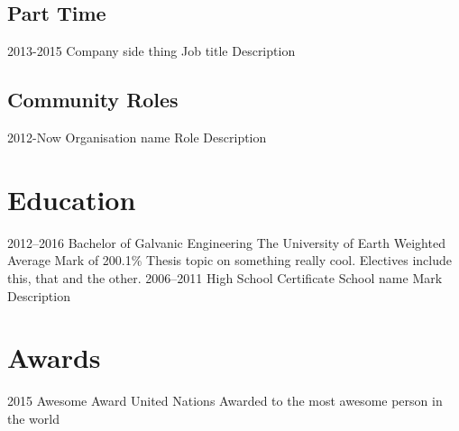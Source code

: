 \documentclass[print]{friggeri-cv}
\begin{document}
    \subsection{Part Time}
        \begin{entrylist}
            \entry
                {2013-2015}
                {Company} 
                {side thing}
                {Job title}
                {Description}
        \end{entrylist}
    \subsection{Community Roles}
        \begin{entrylist}
            \entry
                {2012-Now}
                {Organisation name} 
                {}
                {Role}
                {Description}
        \end{entrylist}

\section{Education}
    \begin{entrylist} 
        \entry
            {2012--2016}
            {Bachelor of Galvanic Engineering}
            {The University of Earth}
            {Weighted Average Mark of 200.1\%}
            {
                Thesis topic on something really cool. Electives include this, that and the other.
            }
        \entry
            {2006--2011}  
            {High School Certificate}
            {School name}
            {Mark} 
            {
                Description
            }
    \end{entrylist}

\section{Awards}
\begin{entrylist}
    \entry
        {2015}
        {Awesome Award}
        {United Nations} 
        {} 
        {Awarded to the most awesome person in the world}
\end{entrylist}
\end{document}
